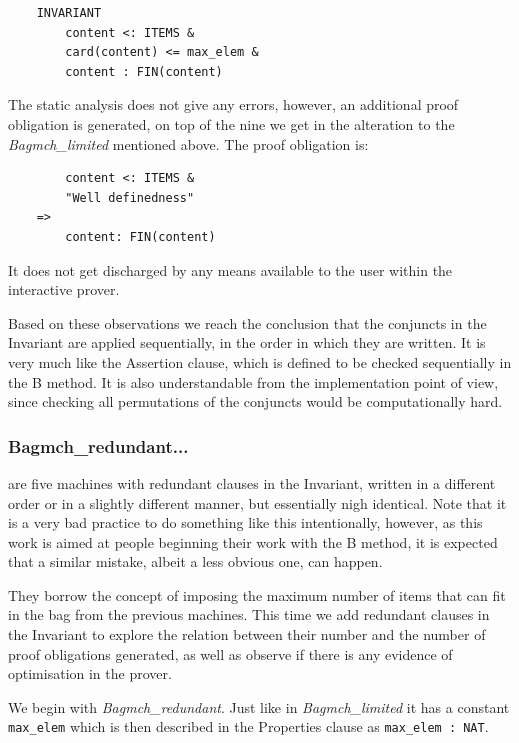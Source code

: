 \documentclass[12pt,journal,duplex]{IEEEtran}
\begin{document}
	\begin{lstlisting}
	INVARIANT
		content <: ITEMS &
		card(content) <= max_elem &
		content : FIN(content)
	\end{lstlisting}

	The static analysis does not give any errors, however, an additional proof obligation is generated, on top of the nine we get in the alteration to the \emph{Bagmch\_limited} mentioned above. The proof obligation is:

	\begin{lstlisting}
    	content <: ITEMS &
		"Well definedness"
	=>
		content: FIN(content)
	\end{lstlisting}

	It does not get discharged by any means available to the user within the interactive prover.

	Based on these observations we reach the conclusion that the conjuncts in the Invariant are applied sequentially, in the order in which they are written. It is very much like the Assertion clause, which is defined to be checked sequentially in the B method. It is also understandable from the implementation point of view, since checking all permutations of the conjuncts would be computationally hard.

	\subsubsection{Bagmch\_redundant...} are five machines with redundant clauses in the Invariant, written in a different order or in a slightly different manner, but essentially nigh identical. Note that it is a very bad practice to do something like this intentionally, however, as this work is aimed at people beginning their work with the B method, it is expected that a similar mistake, albeit a less obvious one, can happen.

	They borrow the concept of imposing the maximum number of items that can fit in the bag from the previous machines. This time we add redundant clauses in the Invariant to explore the relation between their number and the number of proof obligations generated, as well as observe if there is any evidence of optimisation in the prover.

	We begin with \emph{Bagmch\_redundant}. Just like in \emph{Bagmch\_limited} it has a constant \texttt{max\_elem} which is then described in the Properties clause as \texttt{max\_elem : NAT}.
\end{document}
